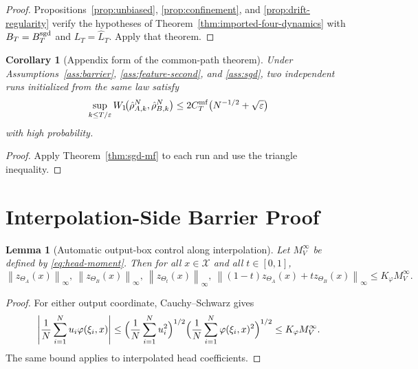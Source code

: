 \documentclass[11pt]{article}
\newtheorem{lemma}[theorem]{Lemma}
\newtheorem{corollary}[theorem]{Corollary}
\theoremstyle{definition}
\newcommand{\norm}[1]{\left\lVert #1 \right\rVert}
\newcommand{\abs}[1]{\left\lvert #1 \right\rvert}
\newcommand{\mc}[1]{\mathcal{#1}}
\begin{document}
\begin{proof}
Propositions~\ref{prop:unbiased}, \ref{prop:confinement}, and
\ref{prop:drift-regularity} verify the hypotheses of
Theorem~\ref{thm:imported-four-dynamics} with $B_T=B_T^{\rm sgd}$ and
$L_T=\widehat L_T$. Apply that theorem.
\end{proof}

\begin{corollary}[Appendix form of the common-path theorem]
\label{cor:shared-path}
Under Assumptions~\ref{ass:barrier}, \ref{ass:feature-second}, and
\ref{ass:sgd}, two independent runs initialized from the same law satisfy
\[
  \sup_{k\le T/\varepsilon}
  W_1\!\bigl(\hat\rho_{A,k}^N,\hat\rho_{B,k}^N\bigr)
  \le
  2C_T^{\rm mf}\bigl(N^{-1/2}+\sqrt{\varepsilon}\bigr)
\]
with high probability.
\end{corollary}

\begin{proof}
Apply Theorem~\ref{thm:sgd-mf} to each run and use the triangle inequality.
\end{proof}

\section{Interpolation-Side Barrier Proof}

\begin{lemma}[Automatic output-box control along interpolation]
\label{lem:auto-box}
Let $M_V^\infty$ be defined by \eqref{eq:head-moment}. Then for all
$x\in\mc{X}$ and all $t\in[0,1]$,
\[
  \norm{z_{\Theta_A}(x)}_\infty,
  \ \norm{z_{\Theta_B}(x)}_\infty,
  \ \norm{z_{\Theta_t}(x)}_\infty,
  \ \norm{(1-t)z_{\Theta_A}(x)+t z_{\Theta_B}(x)}_\infty
  \le
  K_\varphi M_V^\infty.
\]
\end{lemma}

\begin{proof}
For either output coordinate, Cauchy--Schwarz gives
\[
  \abs{\frac1N\sum_{i=1}^N u_i\varphi(\xi_i,x)}
  \le
  \Bigl(\frac1N\sum_{i=1}^N u_i^2\Bigr)^{1/2}
  \Bigl(\frac1N\sum_{i=1}^N \varphi(\xi_i,x)^2\Bigr)^{1/2}
  \le
  K_\varphi M_V^\infty.
\]
The same bound applies to interpolated head coefficients.
\end{proof}
\end{document}
